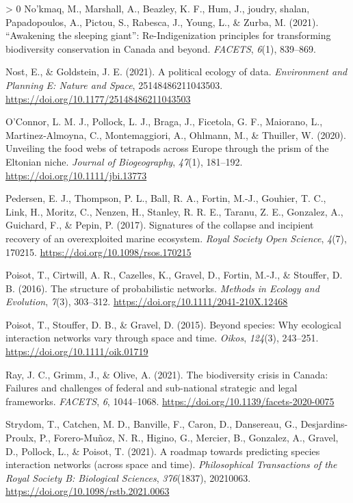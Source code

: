 \documentclass[11pt]{article}
\newlength{\cslhangindent}
\newenvironment{CSLReferences}[3] %
 {%
  \setlength{\parindent}{0pt}
  \ifodd #1 \everypar{\setlength{\hangindent}{\cslhangindent}}\ignorespaces\fi
  \ifnum #2 > 0
  \setlength{\parskip}{#2\baselineskip}
  \fi
 }%
 {}
\begin{document}
\begin{CSLReferences}{1}{0}
\leavevmode\hypertarget{ref-Nokmaq2021AwaSle}{}%
No'kmaq, M., Marshall, A., Beazley, K. F., Hum, J., joudry, shalan,
Papadopoulos, A., Pictou, S., Rabesca, J., Young, L., \& Zurba, M.
(2021). {``Awakening the sleeping giant''}: Re-Indigenization principles
for transforming biodiversity conservation in Canada and beyond.
\emph{FACETS}, \emph{6}(1), 839--869.

\leavevmode\hypertarget{ref-Nost2021PolEco}{}%
Nost, E., \& Goldstein, J. E. (2021). A political ecology of data.
\emph{Environment and Planning E: Nature and Space}, 25148486211043503.
\url{https://doi.org/10.1177/25148486211043503}

\leavevmode\hypertarget{ref-OConnor2020UnvFoo}{}%
O'Connor, L. M. J., Pollock, L. J., Braga, J., Ficetola, G. F.,
Maiorano, L., Martinez‐Almoyna, C., Montemaggiori, A., Ohlmann, M., \&
Thuiller, W. (2020). Unveiling the food webs of tetrapods across Europe
through the prism of the Eltonian niche. \emph{Journal of Biogeography},
\emph{47}(1), 181--192. \url{https://doi.org/10.1111/jbi.13773}

\leavevmode\hypertarget{ref-Pedersen2017SigCol}{}%
Pedersen, E. J., Thompson, P. L., Ball, R. A., Fortin, M.-J., Gouhier,
T. C., Link, H., Moritz, C., Nenzen, H., Stanley, R. R. E., Taranu, Z.
E., Gonzalez, A., Guichard, F., \& Pepin, P. (2017). Signatures of the
collapse and incipient recovery of an overexploited marine ecosystem.
\emph{Royal Society Open Science}, \emph{4}(7), 170215.
\url{https://doi.org/10.1098/rsos.170215}

\leavevmode\hypertarget{ref-Poisot2016StrPro}{}%
Poisot, T., Cirtwill, A. R., Cazelles, K., Gravel, D., Fortin, M.-J., \&
Stouffer, D. B. (2016). The structure of probabilistic networks.
\emph{Methods in Ecology and Evolution}, \emph{7}(3), 303--312.
\url{https://doi.org/10.1111/2041-210X.12468}

\leavevmode\hypertarget{ref-Poisot2015SpeWhy}{}%
Poisot, T., Stouffer, D. B., \& Gravel, D. (2015). Beyond species: Why
ecological interaction networks vary through space and time.
\emph{Oikos}, \emph{124}(3), 243--251.
\url{https://doi.org/10.1111/oik.01719}

\leavevmode\hypertarget{ref-Ray2021BioCri}{}%
Ray, J. C., Grimm, J., \& Olive, A. (2021). The biodiversity crisis in
Canada: Failures and challenges of federal and sub-national strategic
and legal frameworks. \emph{FACETS}, \emph{6}, 1044--1068.
\url{https://doi.org/10.1139/facets-2020-0075}

\leavevmode\hypertarget{ref-Strydom2021RoaPre}{}%
Strydom, T., Catchen, M. D., Banville, F., Caron, D., Dansereau, G.,
Desjardins-Proulx, P., Forero-Muñoz, N. R., Higino, G., Mercier, B.,
Gonzalez, A., Gravel, D., Pollock, L., \& Poisot, T. (2021). A roadmap
towards predicting species interaction networks (across space and time).
\emph{Philosophical Transactions of the Royal Society B: Biological
Sciences}, \emph{376}(1837), 20210063.
\url{https://doi.org/10.1098/rstb.2021.0063}


\end{CSLReferences}
\end{document}
